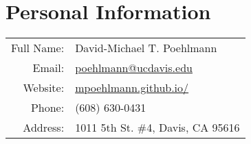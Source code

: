\section{Personal Information}


\begin{tabularx}{\textwidth}{r I}

  Full Name:             & David-Michael T. Poehlmann \\ %
  Email:                 & \href{mailto:poehlmann@ucdavis.edu}{poehlmann@ucdavis.edu} \\
  Website:               & \href{https://mpoehlmann.github.io}{mpoehlmann.github.io/}\\
  Phone:                 & (608) 630-0431\\
  Address:               & 1011 5th St. \#4, Davis, CA 95616 \\

\end{tabularx}


